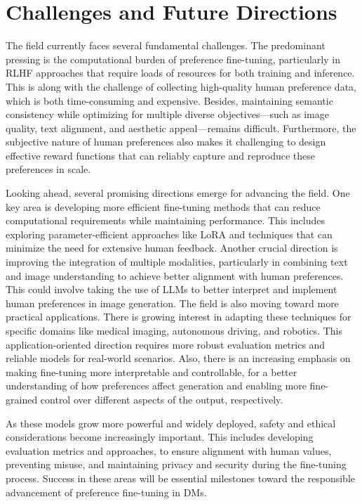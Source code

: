 \section{Challenges and Future Directions}
\label{sec:challenges_and_future_directions}
The field currently faces several fundamental challenges. 
The predominant pressing is the computational burden of preference fine-tuning, particularly in RLHF approaches that require loads of resources for both training and inference. 
This is along with the challenge of collecting high-quality human preference data, which is both time-consuming and expensive. 
Besides, maintaining semantic consistency while optimizing for multiple diverse objectives---such as image quality, text alignment, and aesthetic appeal---remains difficult. 
Furthermore, the subjective nature of human preferences also makes it challenging to design effective reward functions that can reliably capture and reproduce these preferences in scale.

Looking ahead, several promising directions emerge for advancing the field. 
One key area is developing more efficient fine-tuning methods that can reduce computational requirements while maintaining performance. 
This includes exploring parameter-efficient approaches like LoRA and techniques that can minimize the need for extensive human feedback. 
Another crucial direction is improving the integration of multiple modalities, particularly in combining text and image understanding to achieve better alignment with human preferences. 
This could involve taking the use of LLMs to better interpret and implement human preferences in image generation. The field is also moving toward more practical applications. 
There is growing interest in adapting these techniques for specific domains like medical imaging, autonomous driving, and robotics. 
This application-oriented direction requires more robust evaluation metrics and reliable models for real-world scenarios. 
Also, there is an increasing emphasis on making fine-tuning more interpretable and controllable, for a better understanding of how preferences affect generation and enabling more fine-grained control over different aspects of the output, respectively.

As these models grow more powerful and widely deployed, safety and ethical considerations become increasingly important. This includes developing evaluation metrics and approaches, to ensure alignment with human values, preventing misuse, and maintaining privacy and security during the fine-tuning process. Success in these areas will be essential milestones toward the responsible advancement of preference fine-tuning in DMs.




